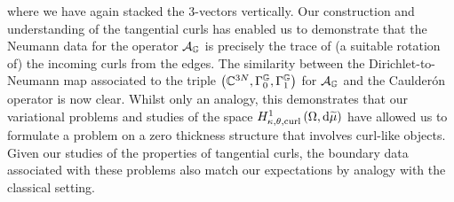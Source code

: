 where we have again stacked the 3-vectors vertically.
Our construction and understanding of the tangential curls has enabled us to demonstrate that the Neumann data for the operator $\mathcal{A}_{\mathbb{G}}$ is precisely the trace of (a suitable rotation of) the incoming curls from the edges.
The similarity between the Dirichlet-to-Neumann map associated to the triple $\left( \mathbb{C}^{3N}, \Gamma_0^{\mathbb{G}}, \Gamma_1^{\mathbb{G}} \right)$ for $\mathcal{A}_{\mathbb{G}}$ and the Caulder\'{o}n operator is now clear.
Whilst only an analogy, this demonstrates that our variational problems and studies of the space $H^1_{\kappa,\theta,\mathrm{curl}}\left( \Omega, \mathrm{d}\widetilde{\mu} \right)$ have allowed us to formulate a problem on a zero thickness structure that involves curl-like objects.
Given our studies of the properties of tangential curls, the boundary data associated with these problems also match our expectations by analogy with the classical setting.